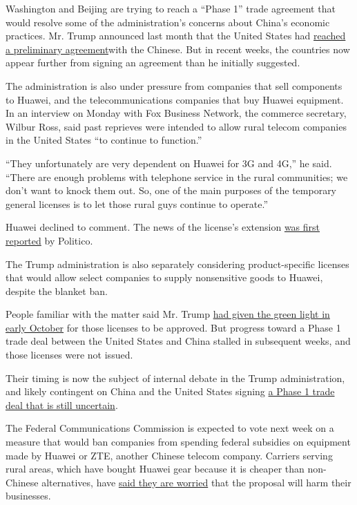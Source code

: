 Washington and Beijing are trying to reach a ``Phase 1'' trade agreement
that would resolve some of the administration's concerns about China's
economic practices. Mr. Trump announced last month that the United
States had
\href{https://www.nytimes3xbfgragh.onion/2019/10/11/business/economy/us-china-trade-deal.html?module=inline}{reached
a preliminary agreement}with the Chinese. But in recent weeks, the
countries now appear further from signing an agreement than he initially
suggested.

The administration is also under pressure from companies that sell
components to Huawei, and the telecommunications companies that buy
Huawei equipment. In an interview on Monday with Fox Business Network,
the commerce secretary, Wilbur Ross, said past reprieves were intended
to allow rural telecom companies in the United States ``to continue to
function.''

``They unfortunately are very dependent on Huawei for 3G and 4G,'' he
said. ``There are enough problems with telephone service in the rural
communities; we don't want to knock them out. So, one of the main
purposes of the temporary general licenses is to let those rural guys
continue to operate.''

Huawei declined to comment. The news of the license's extension
\href{https://www.politico.com/news/2019/11/14/huawei-trade-waiver-070982}{was
first reported} by Politico.

The Trump administration is also separately considering product-specific
licenses that would allow select companies to supply nonsensitive goods
to Huawei, despite the blanket ban.

People familiar with the matter said Mr. Trump
\href{https://www.nytimes3xbfgragh.onion/2019/10/09/us/politics/trump-huawei-trade.html}{had
given the green light in early October} for those licenses to be
approved. But progress toward a Phase 1 trade deal between the United
States and China stalled in subsequent weeks, and those licenses were
not issued.

Their timing is now the subject of internal debate in the Trump
administration, and likely contingent on China and the United States
signing
\href{https://www.nytimes3xbfgragh.onion/2019/11/12/business/trump-trade-economy.html}{a
Phase 1 trade deal that is still uncertain}.

The Federal Communications Commission is expected to vote next week on a
measure that would ban companies from spending federal subsidies on
equipment made by Huawei or ZTE, another Chinese telecom company.
Carriers serving rural areas, which have bought Huawei gear because it
is cheaper than non-Chinese alternatives, have
\href{https://www.nytimes3xbfgragh.onion/2019/05/25/technology/huawei-rural-wireless-service.html?module=inline}{said
they are worried} that the proposal will harm their businesses.

